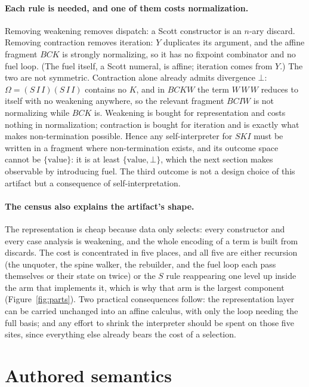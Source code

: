 \documentclass[review]{jfp-epi}
\begin{document}
\paragraph{Each rule is needed, and one of them costs normalization.}
Removing weakening removes dispatch: a Scott constructor is an $n$-ary
discard. Removing contraction removes iteration: $Y$ duplicates its
argument, and the affine fragment $BCK$ is strongly normalizing, so it
has no fixpoint combinator and no fuel loop. (The fuel itself, a Scott
numeral, is affine; iteration comes from $Y$.) The two are not
symmetric. Contraction alone already admits divergence $\bot$:
$\Omega = (S\,I\,I)(S\,I\,I)$ contains no $K$, and in $BCKW$ the term
$W\,W\,W$ reduces to itself with no weakening anywhere, so the relevant
fragment $BCIW$ is not normalizing while $BCK$ is. Weakening is bought
for representation and costs nothing in normalization; contraction is
bought for iteration and is exactly what makes non-termination
possible. Hence any self-interpreter for $SKI$ must be written in a
fragment where non-termination exists, and its outcome space cannot be
$\{\text{value}\}$: it is at least $\{\text{value}, \bot\}$,
which the next section makes observable by introducing fuel. The third
outcome is not a design choice of this artifact but a consequence of
self-interpretation.

\paragraph{The census also explains the artifact's shape.} The
representation is cheap because data only selects: every constructor and
every case analysis is weakening, and the whole encoding of a term is
built from discards. The cost is concentrated in five places, and all
five are either recursion (the unquoter, the spine walker, the
rebuilder, and the fuel loop each pass themselves or their state on
twice) or the $S$ rule reappearing one level up inside the arm that
implements it, which is why that arm is the largest component
(Figure~\ref{fig:parts}). Two practical consequences follow: the
representation layer can be carried unchanged into an affine calculus,
with only the loop needing the full basis; and any effort to shrink the
interpreter should be spent on those five sites, since everything else
already bears the cost of a selection.

\section{Authored semantics}\label{sec:authored}
\end{document}
